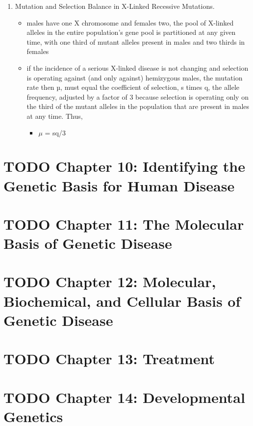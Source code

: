 \documentclass{scrartcl}
\begin{document}
\begin{enumerate}
\item Mutation and Selection Balance in X-Linked Recessive Mutations.
\label{sec:orgb2a78ad}
\begin{itemize}
\item males have one X chromosome and females two, the pool of X-linked
alleles in the entire population’s gene pool is partitioned at any
given time, with one third of mutant alleles present in males and
two thirds in females
\item if the incidence of a serious X-linked disease is not changing and
selection is operating against (and only against) hemizygous males,
the mutation rate then µ, must equal the coefficient of selection, s
times q, the allele frequency, adjusted by a factor of 3 because
selection is operating only on the third of the mutant alleles in
the population that are present in males at any time. Thus,
\begin{itemize}
\item \(\mu\) = sq/3
\end{itemize}
\end{itemize}
\end{enumerate}


\section{{\bfseries\sffamily TODO} Chapter 10: Identifying the Genetic Basis for Human Disease}
\label{sec:org016fecf}
\section{{\bfseries\sffamily TODO} Chapter 11: The Molecular Basis of Genetic Disease}
\label{sec:org199a8fc}
\section{{\bfseries\sffamily TODO} Chapter 12: Molecular, Biochemical, and Cellular Basis of Genetic Disease}
\label{sec:orgf95d313}
\section{{\bfseries\sffamily TODO} Chapter 13: Treatment}
\label{sec:orgc37c7d3}
\section{{\bfseries\sffamily TODO} Chapter 14: Developmental Genetics}
\label{sec:org2fc24f7}
\end{document}
